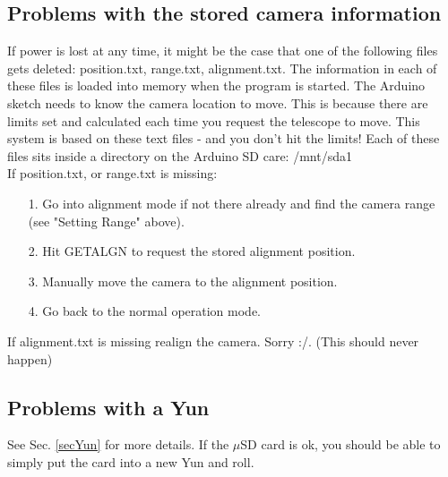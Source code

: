 \documentclass[11pt]{article}
\begin{document}
\subsection{Problems with the stored camera information}
If power is lost at any time, it might be the case that one of the following files gets deleted: position.txt, range.txt, alignment.txt. 
The information in each of these files is loaded into memory when the program is started.
The Arduino sketch needs to know the camera location to move.
This is because there are limits set and calculated each time you request the telescope to move.
This system is based on these text files - and you don't hit the limits!
Each of these files sits inside a directory on the Arduino SD care: /mnt/sda1\\[15pt]
If position.txt, or range.txt is missing:
\begin{enumerate}
\item[1.] Go into alignment mode if not there already and find the camera range (see "Setting Range" above).
\item[2.] Hit GETALGN to request the stored alignment position.
\item[3.] Manually move the camera to the alignment position.
\item[4.] Go back to the normal operation mode.
\end{enumerate}
If alignment.txt is missing realign the camera. Sorry :/. (This should never happen)

\subsection{Problems with a Yun}
See Sec. \ref{secYun} for more details.
If the $\mu$SD card is ok, you should be able to simply put the card into a new Yun and roll.
\end{document}
